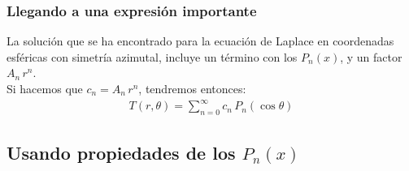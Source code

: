 \documentclass[12pt]{beamer}
\begin{document}
\begin{frame}
\frametitle{Llegando a una expresión importante}
La solución que se ha encontrado para la ecuación de Laplace en coordenadas esféricas con simetría azimutal, incluye un término con los $P_{n}(x)$, y un factor $A_{n} \, r^{n}$.
\\
\bigskip
\pause
Si hacemos que $c_{n} = A_{n} \, r^{n}$, tendremos entonces:
\begin{align*}
T(r, \theta) = \sum_{n=0}^{\infty} c_{n} \, P_{n} (\cos \theta)
\end{align*}
\end{frame}

\subsection{Usando propiedades de los \texorpdfstring{$P_{n}(x)$}{Pn(x)}}
\end{document}
